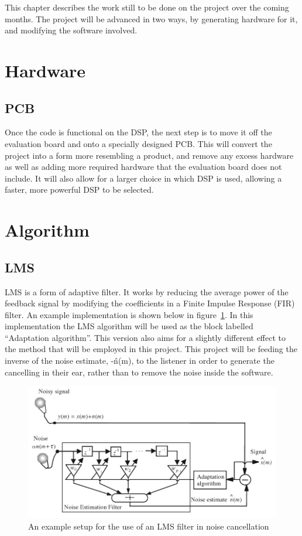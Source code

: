 This chapter describes the work still to be done on the project over the coming months.
The project will be advanced in two ways, by generating hardware for it, and modifying the software involved.

\section{Hardware}
\subsection{PCB}
Once the code is functional on the DSP, the next step is to move it off the evaluation board and onto a specially designed PCB.
This will convert the project into a form more resembling a product, and remove any excess hardware as well as adding more required hardware that the evaluation board does not include.
It will also allow for a larger choice in which DSP is used, allowing a faster, more powerful DSP to be selected.

\section{Algorithm}
\subsection{LMS}
\label{sec:LMS}
LMS is a form of adaptive filter.
It works by reducing the average power of the feedback signal by modifying the coefficients in a Finite Impulse Response (FIR) filter.
An example implementation is shown below in figure~\ref{fig:lmsfilter}.
In this implementation the LMS algorithm will be used as the block labelled ``Adaptation algorithm''.
This version also aims for a slightly different effect to the method that will be employed in this project.
This project will be feeding the inverse of the noise estimate, -\^{n}(m), to the listener in order to generate the cancelling in their ear, rather than to remove the noise inside the software.

\begin{figure}[H]
	\centering
	\includegraphics[width=\textwidth]{./img/lmsfilter.png}
	\caption{An example setup for the use of an LMS filter in noise cancellation \cite{AdvancedDSPing}}
	\label{fig:lmsfilter}
\end{figure}

